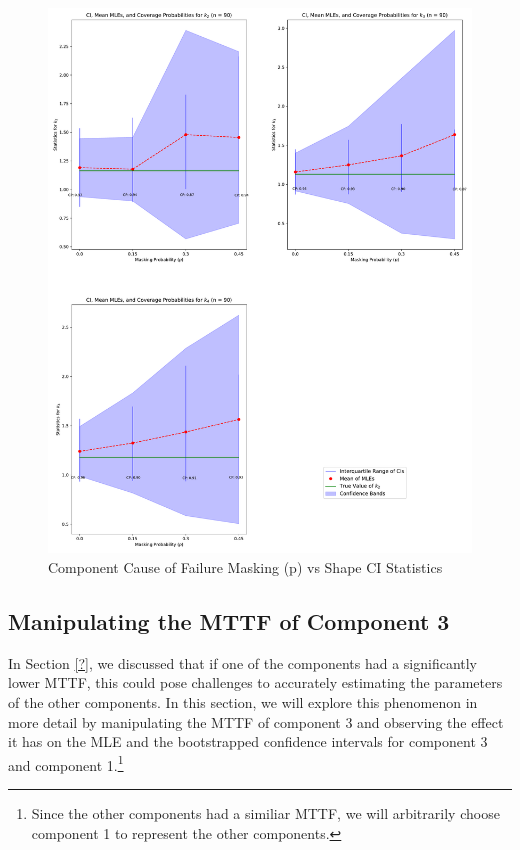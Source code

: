 \documentclass[
]{article}
\begin{document}
\begin{figure}

{\centering \includegraphics{image/plot-p-vs-stats-shapes-n90} 

}

\caption{Component Cause of Failure Masking (p) vs Shape CI Statistics}\label{fig:masking-prob-vs-stats-shape}
\end{figure}

\hypertarget{sec:mttf-c3}{%
\subsection{Manipulating the MTTF of Component 3}\label{sec:mttf-c3}}

In Section \ref{?}, we discussed that if one of the components had a
significantly lower MTTF, this could pose challenges to accurately
estimating the parameters of the other components. In this section, we
will explore this phenomenon in more detail by manipulating the MTTF of
component 3 and observing the effect it has on the MLE and the
bootstrapped confidence intervals for component 3 and component
1.\footnote{Since the other components had a similiar MTTF, we
will arbitrarily choose component 1 to represent the other components.}
\end{document}

